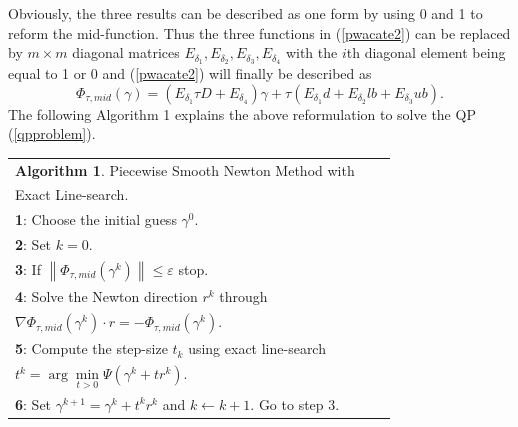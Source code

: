 \documentclass[journal]{IEEEtran}
\begin{document}
Obviously, the three results can be described as one form by using 0 and 1 to reform the mid-function. Thus the three functions in (\ref{pwacate2}) can be replaced by $m\times m$ diagonal matrices ${E_{{\delta _1}}},{E_{{\delta _2}}},{E_{{\delta _3}}},{E_{{\delta _4}}}$ with the $i$th diagonal element being equal to 1 or 0 and (\ref{pwacate2}) will finally be described as
\begin{equation}\label{finalpwa}
{\Phi _{\tau ,mid}}(\gamma ) = ({E_{{\delta _1}}}\tau D + {E_{{\delta _4}}})\gamma  + \tau ({E_{{\delta _1}}}d + {E_{{\delta _2}}}lb + {E_{{\delta _3}}}ub).
\end{equation}
The following Algorithm 1 explains the above reformulation to solve the QP (\ref{qpproblem}).
\begin{table}[h]
	\begin{center}
		\begin{tabular}{lcl}
			\toprule
			\textbf{Algorithm 1}. Piecewise Smooth Newton Method with \\ Exact Line-search.\\
			\midrule
			\textbf{1}: Choose the initial guess $\gamma^0$.\\
			\textbf{2}: Set $k=0$. \\
			\textbf{3}: If $\left\| {{\Phi  _{\tau ,mid}}({\gamma ^k})} \right\| \le \varepsilon $ stop.\\
			\textbf{4}: Solve the Newton direction $r^k$  through\\ $\nabla {\Phi _{\tau ,mid}}(\gamma^k ) \cdot {r} =  - {\Phi _{\tau ,mid}}(\gamma^k )$.\\
			\textbf{5}: Compute the step-size $t_k$ using exact line-search \\ ${t^k} = \arg \mathop {\min }\limits_{t > 0} \Psi  ({\gamma ^k} + t{r^k})$.\\
			\textbf{6}: Set ${\gamma ^{k + 1}} = {\gamma ^k} + {t^k}{r^k}$ and $k \leftarrow k + 1$. Go to step 3.\\
			\toprule
		\end{tabular}
	\end{center}
\end{table}
\end{document}
